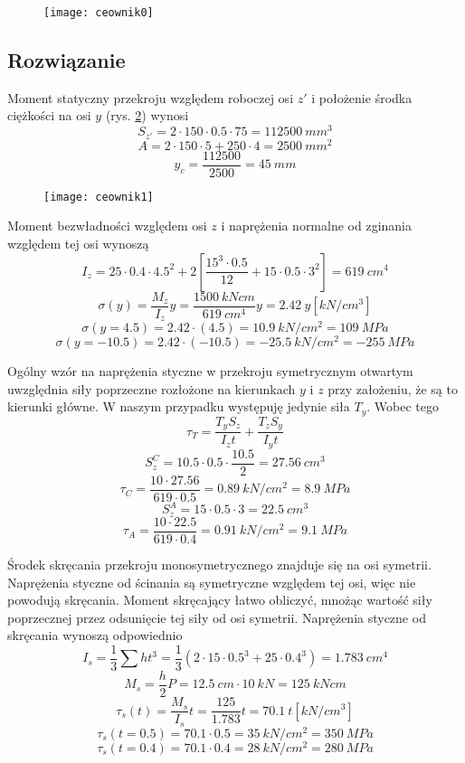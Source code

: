 \documentclass[a4paper,11pt]{article}
\begin{document}
\begin{figure}[tbh]\centering
	\texttt{[image: ceownik0]}
	\caption{}
	\label{ceownik0}
\end{figure}

\subsection{Rozwiązanie}
Moment statyczny przekroju względem roboczej osi $z'$ i położenie środka ciężkości na osi $y$ (rys. \ref{ceownik1}) wynosi
\[ S_{z'} = 2 \cdot 150 \cdot 0.5 \cdot 75 = \SI{112500}{mm^3} \]
\[ A = 2 \cdot 150 \cdot 5 + 250 \cdot 4 = \SI{2500}{mm^2} \]
\[ y_c = \frac{112500}{2500} = \SI{45}{mm} \]

\begin{figure}[tbh]\centering
	\texttt{[image: ceownik1]}
	\caption{}
	\label{ceownik1}
\end{figure}

Moment bezwładności względem osi $z$ i naprężenia normalne od zginania względem tej osi wynoszą
\[ I_z = 25 \cdot 0.4 \cdot 4.5^2 + 2\left[ \frac{15^3 \cdot 0.5}{12} + 15\cdot 0.5\cdot 3^2 \right] = \SI{619}{cm^4} \]
\[ \sigma(y) = \frac{M_z}{I_z}y = \frac{\SI{1500}{kNcm}}{\SI{619}{cm^4}}y = \SI{2.42}{y [kN/cm^3]} \]
\[ \sigma(y=4.5) = 2.42 \cdot (4.5) = \SI{10.9}{kN/cm^2} = \SI{109}{MPa} \]
\[ \sigma(y=-10.5) = 2.42 \cdot (-10.5) = \SI{-25.5}{kN/cm^2} = \SI{-255}{MPa} \]

Ogólny wzór na naprężenia styczne w przekroju symetrycznym otwartym uwzględnia siły poprzeczne rozłożone na kierunkach $y$ i $z$ przy założeniu, że są to kierunki główne. W naszym przypadku występuję jedynie siła $T_y$. Wobec tego
\[ \tau_T = \frac{T_y S_z}{I_z t} + \frac{T_z S_y}{I_y t} \]
\[ S_z^C = 10.5 \cdot 0.5 \cdot \frac{10.5}{2} = \SI{27.56}{cm^3} \]
\[ \tau_{C} = \frac{10 \cdot27.56}{619\cdot0.5} = \SI{0.89}{kN/cm^2} = \SI{8.9}{MPa}\]
\[ S_z^A = 15 \cdot 0.5 \cdot 3 = \SI{22.5}{cm^3} \]
\[ \tau_{A} = \frac{10 \cdot22.5}{619\cdot0.4} = \SI{0.91}{kN/cm^2} = \SI{9.1}{MPa}\]

Środek skręcania przekroju monosymetrycznego znajduje się na osi symetrii. Naprężenia styczne od ścinania są symetryczne względem tej osi, więc nie powodują skręcania. Moment skręcający łatwo obliczyć, mnożąc wartość siły poprzecznej przez odsunięcie tej siły od osi symetrii. Naprężenia styczne od skręcania wynoszą odpowiednio
\[ I_s = \frac{1}{3}\sum ht^3 = \frac{1}{3}(2\cdot 15\cdot 0.5^3 + 25\cdot 0.4^3) = \SI{1.783}{cm^4} \]
\[ M_s = \frac{h}{2}P = \SI{12.5}{cm}\cdot\SI{10}{kN} = \SI{125}{kNcm} \]
\[ \tau_s(t) = \frac{M_s}{I_s}t = \frac{125}{1.783}t = \SI{70.1}{t[ kN/cm^3]} \]
\[ \tau_s(t=0.5) = 70.1\cdot0.5 = \SI{35}{kN/cm^2} = \SI{350}{MPa} \]
\[ \tau_s(t=0.4) = 70.1\cdot0.4 = \SI{28}{kN/cm^2} = \SI{280}{MPa} \]
\end{document}
